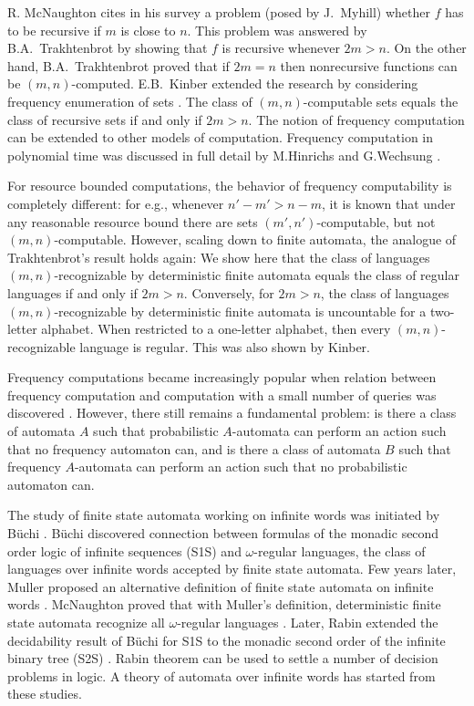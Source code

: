\documentclass{llncs}
\begin{document}
R. McNaughton cites in his survey \cite{M61} a problem (posed by J.~Myhill) whether $f$ has  to be recursive if $m$ is close to $n$. This problem was answered by B.A.~Trakhtenbrot \cite{T64} by showing that $f$ is recursive whenever $2m > n$. On the other hand, B.A.~Trakhtenbrot \cite{T64} proved that if $2m = n$ then nonrecursive functions can be $(m,n)$-computed. E.B.~Kinber extended the research  by considering frequency enumeration of sets \cite{K72}. The class of $(m, n)$-computable sets equals the class of recursive sets if and only if $2m > n$. The notion of frequency computation can be extended to other models of computation.
Frequency computation in polynomial time was discussed in full detail by M.Hinrichs and G.Wechsung \cite{HW97}. 


 For resource bounded computations, the behavior of frequency computability is completely different: for e.g., whenever $n' - m' > n - m$, it is known that under any reasonable resource bound there are sets $(m', n')$-computable, but not $(m, n)$-computable. However, scaling down to finite automata, the analogue of Trakhtenbrot's result holds again: We show here that the class of languages $(m, n)$-recognizable by deterministic finite automata equals the class of regular languages if and only if $2m > n$.   Conversely, for
  $2m > n$, the class of languages $(m, n)$-recognizable by deterministic finite automata \cite{ADHP05} is uncountable for a two-letter alphabet. When restricted to a one-letter alphabet, then every $(m,n)$-recognizable language is regular. This was also shown by Kinber.
  
Frequency computations became increasingly popular when relation between frequency computation and computation with a small number of queries was discovered \cite{K92,HKO92,BGK96,CKKK97}.   However, there still remains a fundamental problem: is there a class of automata $A$ such that probabilistic $A$-automata can perform an action such that no frequency automaton can, and is there a class of automata $B$ such that frequency $A$-automata can perform an action such that no probabilistic automaton can.







The study of finite state automata working on infinite words was initiated by B\"uchi \cite{Bu60}. B\"uchi discovered connection between formulas of the monadic second order logic of infinite sequences (S1S) and $\omega$-regular languages, the class of languages over infinite words accepted by finite state automata. Few years later, Muller proposed an alternative definition of finite state automata on infinite words \cite{Mu63}. McNaughton proved that with Muller's definition, deterministic finite state automata recognize all $\omega$-regular languages \cite{Mc66}. Later, Rabin extended the decidability result of B\"uchi for S1S to the monadic second order of the infinite binary tree (S2S) \cite{Ra69}. Rabin theorem can be used to settle a number of decision problems in logic. A theory of automata over infinite words has started from these studies.
\end{document}
